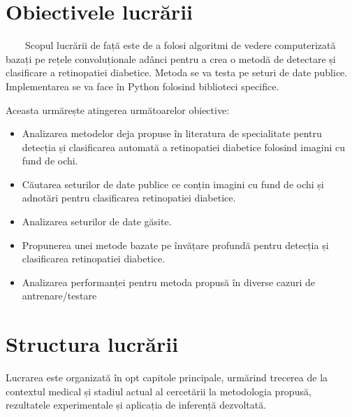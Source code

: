 \documentclass[12pt, a4paper, twoside, romanian]{teza-upb}
\begin{document}
\section*{Obiectivele lucrării}

\ \ \ \ Scopul lucrării de față este de a folosi algoritmi de vedere computerizată
bazați pe rețele convoluționale adânci pentru a crea o metodă de detectare
și clasificare a retinopatiei diabetice. Metoda se va testa pe seturi de
date publice. Implementarea se va face în Python folosind biblioteci specifice.
\bigskip

Aceasta urmărește atingerea următoarelor obiective:

\begin{itemize}
  \item Analizarea metodelor deja propuse în literatura de specialitate pentru detecția și clasificarea
    automată a retinopatiei diabetice folosind
  imagini cu fund de ochi.

  \item Căutarea seturilor de date publice ce conțin imagini cu fund de ochi
    și adnotări pentru clasificarea retinopatiei diabetice.

  \item Analizarea seturilor de date găsite.

  \item Propunerea unei metode bazate pe învățare profundă pentru detecția și clasificarea retinopatiei diabetice.

  \item Analizarea performanței pentru metoda propusă în diverse cazuri de antrenare/testare
\end{itemize}

\section*{Structura lucrării}

Lucrarea este organizată în opt capitole principale, urmărind trecerea de la contextul
medical și stadiul actual al cercetării la metodologia propusă, rezultatele experimentale și
aplicația de inferență dezvoltată.
\end{document}
